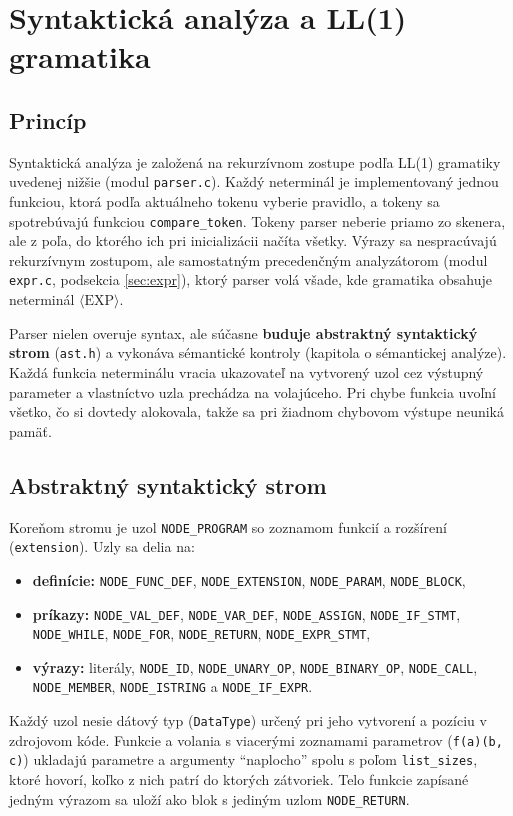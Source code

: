 \section{Syntaktická analýza a LL(1) gramatika}

\subsection{Princíp}
Syntaktická analýza je založená na rekurzívnom zostupe podľa LL(1) gramatiky uvedenej nižšie (modul \texttt{parser.c}). Každý neterminál je implementovaný jednou funkciou, ktorá podľa aktuálneho tokenu vyberie pravidlo, a tokeny sa spotrebúvajú funkciou \texttt{compare\_token}. Tokeny parser neberie priamo zo skenera, ale z poľa, do ktorého ich pri inicializácii načíta všetky. Výrazy sa nespracúvajú rekurzívnym zostupom, ale samostatným precedenčným analyzátorom (modul \texttt{expr.c}, podsekcia \ref{sec:expr}), ktorý parser volá všade, kde gramatika obsahuje neterminál $\langle\text{EXP}\rangle$.

Parser nielen overuje syntax, ale súčasne \textbf{buduje abstraktný syntaktický strom} (\texttt{ast.h}) a vykonáva sémantické kontroly (kapitola o sémantickej analýze). Každá funkcia neterminálu vracia ukazovateľ na vytvorený uzol cez výstupný parameter a vlastníctvo uzla prechádza na volajúceho. Pri chybe funkcia uvoľní všetko, čo si dovtedy alokovala, takže sa pri žiadnom chybovom výstupe neuniká pamäť.

\subsection{Abstraktný syntaktický strom}
Koreňom stromu je uzol \texttt{NODE\_PROGRAM} so zoznamom funkcií a rozšírení (\texttt{extension}). Uzly sa delia na:
\begin{itemize}
    \item \textbf{definície:} \texttt{NODE\_FUNC\_DEF}, \texttt{NODE\_EXTENSION}, \texttt{NODE\_PARAM}, \texttt{NODE\_BLOCK},
    \item \textbf{príkazy:} \texttt{NODE\_VAL\_DEF}, \texttt{NODE\_VAR\_DEF}, \texttt{NODE\_ASSIGN}, \texttt{NODE\_IF\_STMT}, \texttt{NODE\_WHILE}, \texttt{NODE\_FOR}, \texttt{NODE\_RETURN}, \texttt{NODE\_EXPR\_STMT},
    \item \textbf{výrazy:} literály, \texttt{NODE\_ID}, \texttt{NODE\_UNARY\_OP}, \texttt{NODE\_BINARY\_OP}, \texttt{NODE\_CALL}, \texttt{NODE\_MEMBER}, \texttt{NODE\_ISTRING} a \texttt{NODE\_IF\_EXPR}.
\end{itemize}
Každý uzol nesie dátový typ (\texttt{DataType}) určený pri jeho vytvorení a pozíciu v zdrojovom kóde. Funkcie a volania s viacerými zoznamami parametrov (\texttt{f(a)(b, c)}) ukladajú parametre a argumenty ``naplocho'' spolu s poľom \texttt{list\_sizes}, ktoré hovorí, koľko z nich patrí do ktorých zátvoriek. Telo funkcie zapísané jedným výrazom sa uloží ako blok s jediným uzlom \texttt{NODE\_RETURN}.

